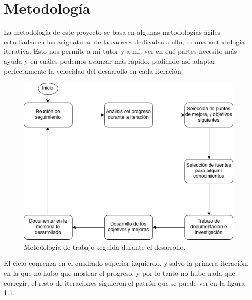 
\chapter{Metodología}
\label{metodologia}
La metodología de este proyecto se basa en algunas metodologías ágiles estudiadas en las asignaturas de la carrera dedicadas a ello, es una metodología iterativa. Esto nos permite a mi tutor y a mí, ver en qué partes necesito más ayuda y en cuáles podemos avanzar más rápido, pudiendo así adaptar perfectamente la velocidad del desarrollo en cada iteración.
\begin{figure}[h]
	\centering
	\includegraphics[width=15cm]{archivos/imagenes/diagrama-de-metodologia.png}
	\caption{Metodología de trabajo seguida durante el desarrollo.}
	\label{diagrama de metodologia}
\end{figure}

El ciclo comienza en el cuadrado superior izquierdo, y salvo la primera iteración, en la que no hubo que mostrar el progreso, y por lo tanto no hubo nada que corregir, el resto de iteraciones siguieron el patrón que se puede ver en la figura \ref{diagrama de metodologia}.

